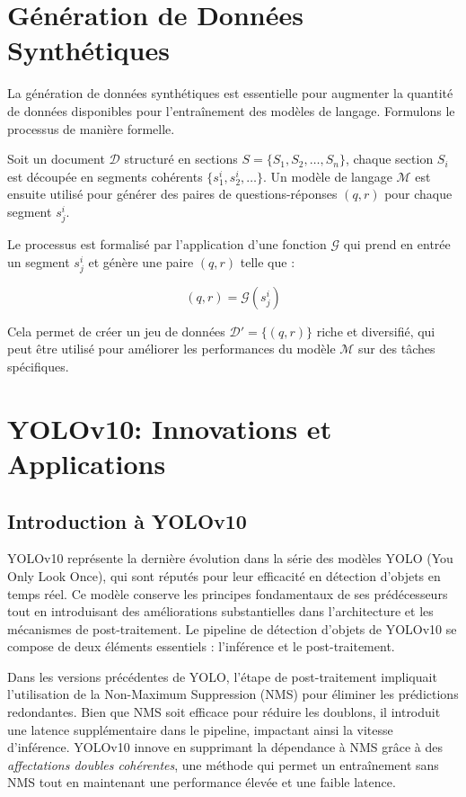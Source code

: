 \documentclass[13pt,a4paper]{article}
\begin{document}
\section{Génération de Données Synthétiques}

La génération de données synthétiques est essentielle pour augmenter la quantité de données disponibles pour l'entraînement des modèles de langage. Formulons le processus de manière formelle.

Soit un document $\mathcal{D}$ structuré en sections $S = \{S_1, S_2, \dots, S_n\}$, chaque section $S_i$ est découpée en segments cohérents $\{s_1^i, s_2^i, \dots\}$. Un modèle de langage $\mathcal{M}$ est ensuite utilisé pour générer des paires de questions-réponses $(q, r)$ pour chaque segment $s_j^i$.

Le processus est formalisé par l'application d'une fonction $\mathcal{G}$ qui prend en entrée un segment $s_j^i$ et génère une paire $(q, r)$ telle que :

\[
(q, r) = \mathcal{G}(s_j^i)
\]

Cela permet de créer un jeu de données $\mathcal{D}' = \{(q, r)\}$ riche et diversifié, qui peut être utilisé pour améliorer les performances du modèle $\mathcal{M}$ sur des tâches spécifiques.


\section{YOLOv10: Innovations et Applications}

\subsection{Introduction à YOLOv10}

YOLOv10 représente la dernière évolution dans la série des modèles YOLO (You Only Look Once), qui sont réputés pour leur efficacité en détection d'objets en temps réel. Ce modèle conserve les principes fondamentaux de ses prédécesseurs tout en introduisant des améliorations substantielles dans l'architecture et les mécanismes de post-traitement. Le pipeline de détection d'objets de YOLOv10 se compose de deux éléments essentiels : l'inférence et le post-traitement.

Dans les versions précédentes de YOLO, l'étape de post-traitement impliquait l'utilisation de la Non-Maximum Suppression (NMS) pour éliminer les prédictions redondantes. Bien que NMS soit efficace pour réduire les doublons, il introduit une latence supplémentaire dans le pipeline, impactant ainsi la vitesse d'inférence. YOLOv10 innove en supprimant la dépendance à NMS grâce à des \textit{affectations doubles cohérentes}, une méthode qui permet un entraînement sans NMS tout en maintenant une performance élevée et une faible latence.
\end{document}
